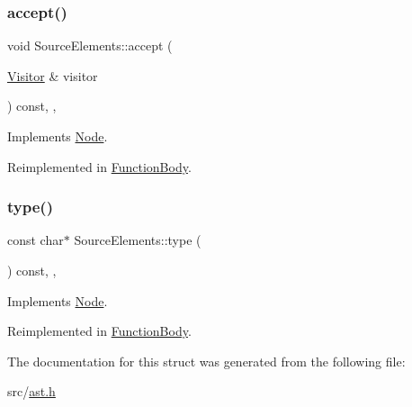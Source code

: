 \subsubsection{\texorpdfstring{accept()}{accept()}}
{\footnotesize\ttfamily void Source\+Elements\+::accept (\begin{DoxyParamCaption}\item[{\hyperlink{struct_visitor}{Visitor} \&}]{visitor }\end{DoxyParamCaption}) const\hspace{0.3cm}{\ttfamily [inline]}, {\ttfamily [override]}, {\ttfamily [virtual]}}



Implements \hyperlink{struct_node_a10bd7af968140bbf5fa461298a969c71}{Node}.



Reimplemented in \hyperlink{struct_function_body_ab6acc0d3e8a2bf452045ee4adc78aa26}{Function\+Body}.

\mbox{\label{struct_source_elements_a2e6131a995ee5d7e0c8e7a440827245d}} 
\subsubsection{\texorpdfstring{type()}{type()}}
{\footnotesize\ttfamily const char$\ast$ Source\+Elements\+::type (\begin{DoxyParamCaption}{ }\end{DoxyParamCaption}) const\hspace{0.3cm}{\ttfamily [inline]}, {\ttfamily [override]}, {\ttfamily [virtual]}}



Implements \hyperlink{struct_node_a82f29420d0a38efcc370352528e94e9b}{Node}.



Reimplemented in \hyperlink{struct_function_body_a8f56476c603667a3a3240de9c2ee02bc}{Function\+Body}.



The documentation for this struct was generated from the following file\+:\begin{DoxyCompactItemize}
\item 
src/\hyperlink{ast_8h}{ast.\+h}\end{DoxyCompactItemize}
